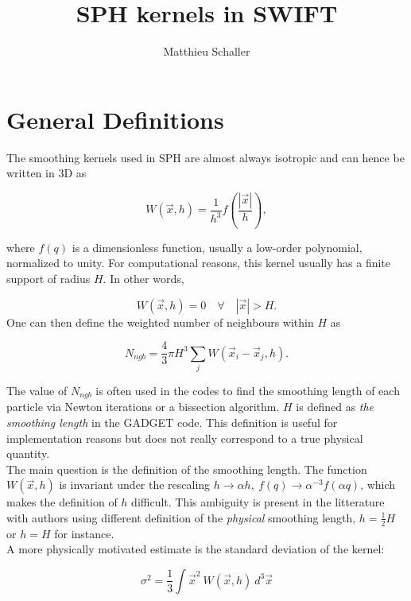\documentclass[a4paper,10pt]{article}
\title{SPH kernels in SWIFT}
\author{Matthieu Schaller}
\begin{document}
\maketitle

\section{General Definitions}

The smoothing kernels used in SPH are almost always isotropic and can hence be written in 3D as

\begin{equation}
 W(\vec{x},h) = \frac{1}{h^3}f\left(\frac{|\vec{x}|}{h}\right),
\end{equation}

where $f(q)$ is a dimensionless function, usually a low-order polynomial, normalized to unity. For computational 
reasons, this kernel 
usually has a finite support of radius $H$. In other words,

\begin{equation}
 W(\vec{x},h) = 0\quad \forall\quad |\vec{x}| > H.
\end{equation}
 One can then define the weighted number of neighbours within $H$ as

\begin{equation}
 N_{ngb} = \frac{4}{3}\pi H^3 \sum_j W(\vec{x}_i - \vec{x}_j,h).
\end{equation}

The value of $N_{ngb}$ is often used in the codes to find the smoothing length of each particle via Newton iterations 
or a bissection algorithm. $H$ is defined as \emph{the smoothing length} in the GADGET code. This definition is useful 
for implementation reasons but does not really correspond to a true physical quantity. \\
The main question is the definition of the smoothing length. The function $W(\vec{x},h)$ is invariant under the 
rescaling $h\rightarrow \alpha h,~f(q)\rightarrow\alpha^{-3}f(\alpha q)$, which makes the definition of $h$ difficult. 
This ambiguity is present in the litterature with authors using different definition of the \emph{physical} smoothing 
length, $h=\frac{1}{2}H$ or $h=H$ for instance. \\
A more physically motivated estimate is the standard deviation of the kernel:

\begin{equation}
 \sigma^2 = \frac{1}{3} \int \vec{x}^2~W(\vec{x},h)~d^3\vec{x}
\end{equation}
 
\end{document}
